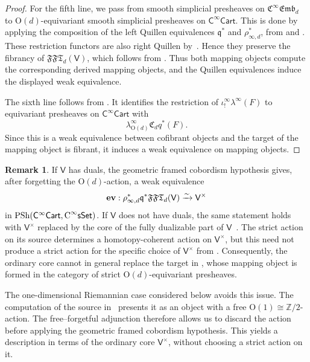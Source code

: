 \documentclass{amsart}
\newcommand{\cat}[1]{\mathsf{#1}}
\newcommand{\sset}{\cat{sSet}}
\newcommand{\CsSet}{\textnormal{C}^{\infty}\sset}
\newcommand{\Cart}{\cat{C}^{\infty}\cat{Cart}}
\newcommand{\femb}[1]{\mathfrak{C}^{\infty}\mathfrak{Emb}_{#1}}
\newcommand{\FFT}{\mathfrak{FFT}}
\renewcommand{\ev}{\textnormal{\textbf{ev}}}
\newcommand{\psh}{\mathrm{PSh}}
\newcommand{\Cc}{\mathfrak{C}}
\theoremstyle{definition}
\newtheorem{remark}[equation]{Remark}
\numberwithin{equation}{subsection}
\numberwithin{subsubsection}{subsection}
\begin{document}
\begin{proof}
  For the fifth line, we pass from smooth simplicial presheaves on \( \femb{d}
  \) to
  \( \mathrm{O}(d) \)-equivariant smooth simplicial presheaves on
  \( \Cart \).
  This is done by applying the composition of the left Quillen equivalences
  \( \mathfrak{q}^{*} \) and \( \rho_{\infty,d}^{*} \), from
   and
  . These restriction functors
  are also right Quillen by~\cite[Proposition~3.3.13]{GP22}. Hence they
  preserve the fibrancy of \(\FFT_{d}(\cat{V})\), which follows from
  . Thus both mapping objects
  compute the corresponding derived mapping objects, and the Quillen
  equivalences induce the displayed weak equivalence.

  The sixth line follows from
  . It identifies the restriction of
  \( \iota^{\infty}_{!}\lambda^{\infty}(F) \) to equivariant presheaves on
  \( \Cart \) with
  \[
    \lambda^{\infty}_{\mathrm{O}(d)}
    \Cc_{d}q^{*}(F).
  \]
  Since this is a weak equivalence between cofibrant objects and the target
  of the mapping object is fibrant, it induces a weak equivalence on mapping
  objects.
\end{proof}

\begin{remark}\label{rem:gch.is.for.noneq}
  If \(\cat{V}\) has duals, the geometric framed cobordism hypothesis
  \cite[Theorem~4.1.8]{GP22} gives, after forgetting the
  \(\mathrm{O}(d)\)-action, a weak equivalence
  \[
    \ev: \rho_{\infty,d}^{*}\mathfrak{q}^{*}\FFT_d(\cat{V})
    \xrightarrow{\sim}
    \cat{V}^{\times}
  \]
  in \(\psh(\Cart,\CsSet)\). If \(\cat{V}\) does not have duals, the same
  statement holds with \(\cat{V}^{\times}\) replaced by the core of the fully
  dualizable part of \(\cat{V}\)~\cite[Definition~2.3.21]{Lur09}. The strict
  action on its source
  determines a homotopy-coherent action on \(\cat{V}^{\times}\), but this
  need not produce a strict action for the specific choice of
  \(\cat{V}^{\times}\) from . Consequently, the ordinary
  core cannot in general
  replace the target in , whose mapping
  object is formed in the category of strict
  \(\mathrm{O}(d)\)-equivariant presheaves.

  The one-dimensional Riemannian case considered below avoids this issue.
  The computation of the source in~\cite{KP26} presents it as an object with a
  free
  \(\mathrm{O}(1)\cong\mathbb{Z}/2\)-action. The free--forgetful adjunction
  therefore allows us to discard the action before applying the geometric
  framed cobordism hypothesis. This yields a description in terms of the
  ordinary core \(\cat{V}^{\times}\), without choosing a strict action on
  it.
\end{remark}
\end{document}
